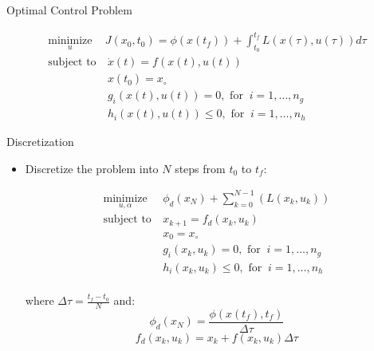 \documentclass[]{beamer}
\providecommand{\tightlist}{%
  \setlength{\itemsep}{0pt}\setlength{\parskip}{0pt}}
\begin{document}
\begin{frame}{Optimal Control Problem}

\begin{align*}
\underset{u}{\text{minimize}}\ & J(x_0,t_0)=\phi(x(t_f))+\int_{t_0}^{t_f}L(x(\tau),u(\tau))d\tau \\
\text{subject to} &\ \dot x(t)=f(x(t),u(t))\\
                  &\ x(t_0)=x_\circ\\
                  &\ g_i(x(t),u(t)) = 0, \text{ for }\ i=1,\ldots,n_g\\
                  &\ h_i(x(t),u(t)) \leq 0, \text{ for }\ i=1,\ldots,n_h
\end{align*}

\end{frame}

\begin{frame}{Discretization}

\begin{itemize}
\tightlist
\item
  Discretize the problem into \(N\) steps from \(t_0\) to \(t_f\):

  \begin{align*}
  \underset{u,\alpha}{\text{minimize}} &\ \phi_d(x_N)+\sum_{k=0}^{N-1}\left(L(x_k,u_k) \right)\\
  \text{subject to} &\ x_{k+1}=f_d(x_k,u_k)\\
                &\ x_0=x_\circ\\
                &\ g_i(x_k,u_k) = 0, \text{ for }\ i=1,\ldots,n_g\\
                &\ h_i(x_k,u_k) \leq 0, \text{ for }\ i=1,\ldots,n_h\\
  \end{align*}

  where \(\Delta\tau=\frac{t_f-t_0}{N}\) and:
  \[\phi_d(x_N)=\frac{\phi(x(t_f),t_f)}{\Delta\tau}\]
  \[f_d(x_k,u_k)=x_k+ f(x_k,u_k)\Delta\tau\]
\end{itemize}

\end{frame}
\end{document}
